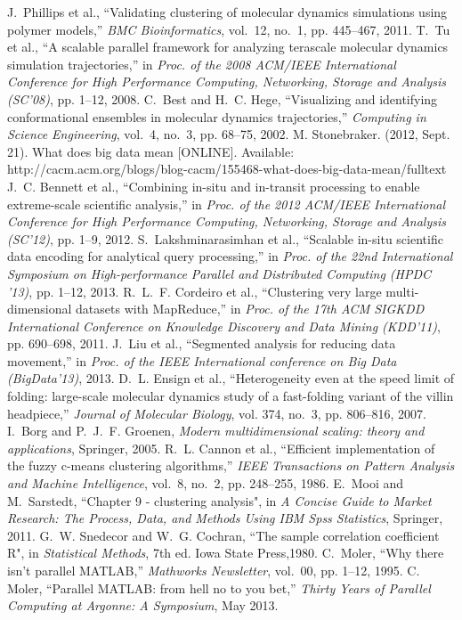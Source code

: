 \documentclass[10pt,conference,compsocconf]{IEEEtran}
\begin{document}
\begin{thebibliography}{10}
 J.~Phillips et al., ``Validating clustering of
  molecular dynamics simulations using polymer models,'' \emph{BMC
    Bioinformatics}, vol.~12, no.~1, pp. 445--467, 2011.  
 T.~Tu et al., ``A scalable parallel framework for
  analyzing terascale molecular dynamics simulation trajectories,'' in
  \emph{Proc. of the 2008 ACM/IEEE International Conference for High
    Performance Computing, Networking, Storage and Analysis (SC'08)}, pp. 1--12, 2008.
 C.~Best and H.~C. Hege, ``Visualizing and
  identifying conformational ensembles in molecular dynamics
  trajectories,'' \emph{Computing in Science Engineering}, vol.~4,
  no.~3, pp. 68--75, 2002.
 M. Stonebraker. (2012, Sept. 21). What does big
  data mean [ONLINE]. Available:
  http://cacm.acm.org/blogs/blog-cacm/155468-what-does-big-data-mean/fulltext
 J.~C. Bennett et al., ``Combining in-situ and
  in-transit processing to enable extreme-scale scientific analysis,''
  in \emph{Proc. of the 2012 ACM/IEEE International Conference for
    High Performance Computing, Networking, Storage and Analysis
    (SC'12)}, pp. 1--9, 2012.
 S.~Lakshminarasimhan et al.,
  ``Scalable in-situ scientific data encoding for analytical query
  processing,'' in \emph{Proc. of the 22nd International Symposium on
    High-performance Parallel and Distributed Computing (HPDC '13)}, pp. 1--12, 2013.
 R.~L.~F. Cordeiro et al., ``Clustering very
  large multi-dimensional datasets with {MapReduce},'' in
  \emph{Proc. of the 17th ACM SIGKDD International Conference on
    Knowledge Discovery and Data Mining (KDD'11)}, pp. 690--698, 2011.
 J.~Liu et al., ``Segmented analysis for reducing
  data movement,'' in \emph{Proc. of the IEEE International conference
    on Big Data (BigData'13)}, 2013.
 D.~L. Ensign et al., ``Heterogeneity even at the
  speed limit of folding: large-scale molecular dynamics study of a
  fast-folding variant of the villin headpiece,'' \emph{Journal of
    Molecular Biology}, vol.  374, no.~3, pp. 806--816, 2007.
 I.~Borg and P.~J.~F. Groenen, \emph{Modern
  multidimensional scaling: theory and applications}, Springer, 2005.
 R.~L. Cannon et al., ``Efficient implementation of the
  fuzzy c-means clustering algorithms,'' \emph{IEEE Transactions on
    Pattern Analysis and Machine Intelligence}, vol.~8, no.~2,
  pp. 248--255, 1986. 
     E.~Mooi and M.~Sarstedt, ``Chapter 9 -
      clustering analysis", in \emph{A Concise Guide to Market
        Research: The Process, Data, and Methods Using {IBM} {Spss}
        Statistics}, Springer, 2011.  
 G.~W. Snedecor and W.~G. Cochran, ``The sample
  correlation coefficient {R}", in \emph{Statistical Methods}, 7th
  ed. Iowa State Press,1980.
   C.~Moler, ``Why there isn't parallel {MATLAB},''
    \emph{Mathworks Newsletter}, vol.~00, pp. 1--12, 1995.
 C. Moler, ``Parallel {MATLAB}: {from hell no to
  you bet},'' \emph{Thirty Years of Parallel Computing at Argonne: A
  Symposium}, May 2013.
\end{thebibliography}



\end{document}
